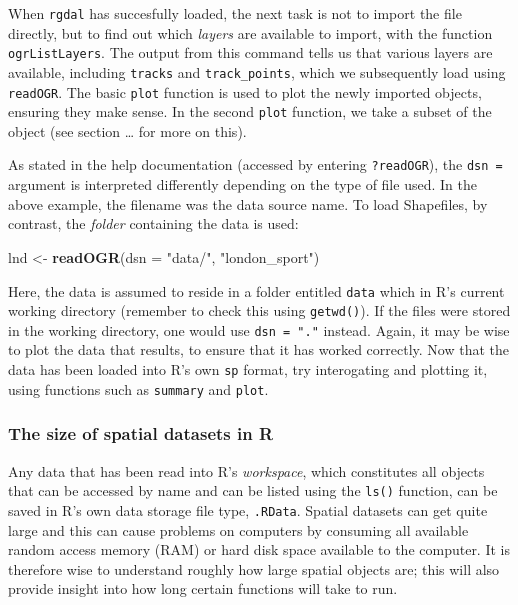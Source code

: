 \documentclass[]{article}
\newenvironment{Shaded}{}{}
\newcommand{\KeywordTok}[1]{\textcolor[rgb]{0.00,0.44,0.13}{\textbf{{#1}}}}
\newcommand{\DataTypeTok}[1]{\textcolor[rgb]{0.56,0.13,0.00}{{#1}}}
\newcommand{\StringTok}[1]{\textcolor[rgb]{0.25,0.44,0.63}{{#1}}}
\newcommand{\NormalTok}[1]{{#1}}
\begin{document}
When \texttt{rgdal} has succesfully loaded, the next task is not to
import the file directly, but to find out which \emph{layers} are
available to import, with the function \texttt{ogrListLayers}. The
output from this command tells us that various layers are available,
including \texttt{tracks} and \texttt{track\_points}, which we
subsequently load using \texttt{readOGR}. The basic \texttt{plot}
function is used to plot the newly imported objects, ensuring they make
sense. In the second \texttt{plot} function, we take a subset of the
object (see section \ldots{} for more on this).

As stated in the help documentation (accessed by entering
\texttt{?readOGR}), the \texttt{dsn =} argument is interpreted
differently depending on the type of file used. In the above example,
the filename was the data source name. To load Shapefiles, by contrast,
the \emph{folder} containing the data is used:

\begin{Shaded}
\begin{Highlighting}[]
\NormalTok{lnd <-}\StringTok{ }\KeywordTok{readOGR}\NormalTok{(}\DataTypeTok{dsn =} \StringTok{"data/"}\NormalTok{, }\StringTok{"london_sport"}\NormalTok{)}
\end{Highlighting}
\end{Shaded}

Here, the data is assumed to reside in a folder entitled \texttt{data}
which in R's current working directory (remember to check this using
\texttt{getwd()}). If the files were stored in the working directory,
one would use \texttt{dsn = "."} instead. Again, it may be wise to plot
the data that results, to ensure that it has worked correctly. Now that
the data has been loaded into R's own \texttt{sp} format, try
interogating and plotting it, using functions such as \texttt{summary}
and \texttt{plot}.

\subsubsection{The size of spatial datasets in R}

Any data that has been read into R's \emph{workspace}, which constitutes
all objects that can be accessed by name and can be listed using the
\texttt{ls()} function, can be saved in R's own data storage file type,
\texttt{.RData}. Spatial datasets can get quite large and this can cause
problems on computers by consuming all available random access memory
(RAM) or hard disk space available to the computer. It is therefore wise
to understand roughly how large spatial objects are; this will also
provide insight into how long certain functions will take to run.
\end{document}
